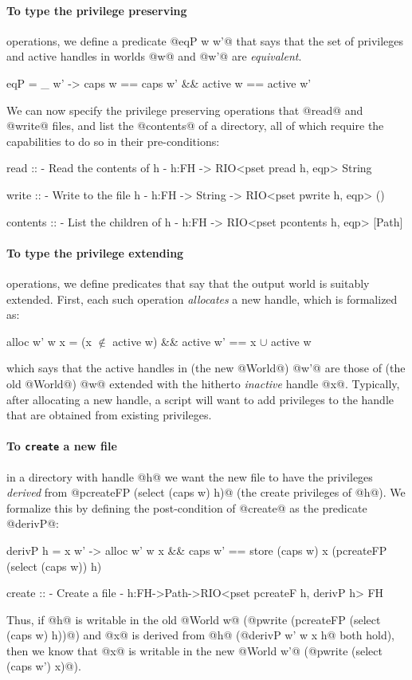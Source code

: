 \paragraph{To type the privilege preserving} operations, we define a predicate
@eqP w w'@ that says that the set of privileges and active handles
in worlds @w@ and @w'@ are \emph{equivalent}.
%
\begin{code}
  eqP = \w _ w' -> 
    caps w == caps w' && active w == active w'
\end{code}
%
We can now specify the privilege preserving operations that @read@ and @write@ files, 
and list the @contents@ of a directory, all of which require the 
capabilities to do so in their pre-conditions:
%
\begin{code}
  read :: {- Read the contents of h -}
    h:FH -> RIO<pset pread h, eqp> String
  
  write :: {- Write to the file h -}
    h:FH -> String -> RIO<pset pwrite h, eqp> ()
  
  contents :: {- List the children of h -}
    h:FH -> RIO<pset pcontents h, eqp> [Path]
\end{code} 

\paragraph{To type the privilege extending} operations, we define 
predicates that say that the output world is suitably 
extended. First, each such operation \emph{allocates} 
a new handle, which is formalized as:
%
\begin{mcode}
  alloc w' w x = 
    (x $\not \in$ active w) && active w' == {x} $\cup$ active w
\end{mcode}
%
which says that the active handles in (the new @World@) 
@w'@ are those of (the old @World@) @w@ extended with the
hitherto \emph{inactive} handle @x@.
%
Typically, after allocating a new handle, a script will
want to add privileges to the handle that are obtained
from existing privileges.

\paragraph{To \texttt{create} a new file} in a directory with handle @h@ we
want the new file to have the privileges \emph{derived} from
@pcreateFP (select (caps w) h)@ (\ie the create privileges of @h@). We
formalize this by defining the post-condition of @create@ as the predicate @derivP@:
%
\begin{code}
  derivP h  = \w x w' -> 
    alloc w' w x && 
    caps w' == store (caps w) x 
                  (pcreateFP (select (caps w)) h)

  create :: {- Create a file -}
    h:FH->Path->RIO<pset pcreateF h, derivP h> FH
\end{code}
%
Thus, if @h@ is writable in the old @World w@ 
(@pwrite (pcreateFP (select (caps w) h))@) and
@x@ is derived from @h@ (@derivP w' w x h@ both hold),
then we know that @x@ is writable in the new @World w'@
(@pwrite (select (caps w') x)@).

